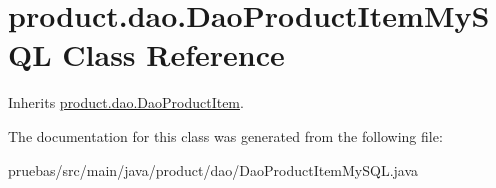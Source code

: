 \hypertarget{classproduct_1_1dao_1_1_dao_product_item_my_s_q_l}{}\section{product.\+dao.\+Dao\+Product\+Item\+My\+S\+QL Class Reference}
\label{classproduct_1_1dao_1_1_dao_product_item_my_s_q_l}


Inherits \mbox{\hyperlink{interfaceproduct_1_1dao_1_1_dao_product_item}{product.\+dao.\+Dao\+Product\+Item}}.



The documentation for this class was generated from the following file\+:\begin{DoxyCompactItemize}
\item 
pruebas/src/main/java/product/dao/Dao\+Product\+Item\+My\+S\+Q\+L.\+java\end{DoxyCompactItemize}
